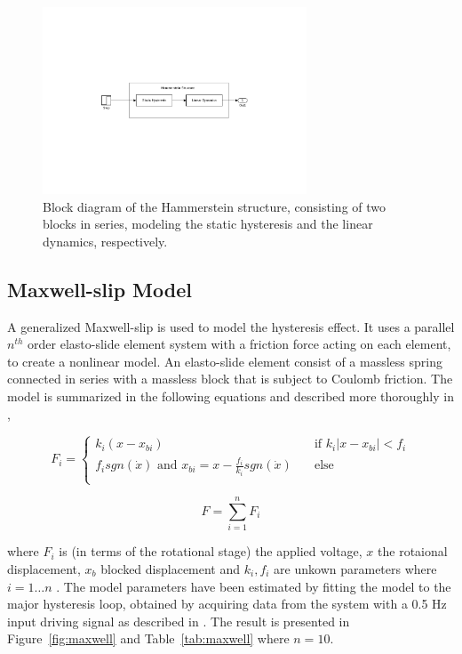 \begin{figure}[h]
  \centering %
  \includegraphics[width=0.7\textwidth, trim=8cm 8cm 7.73cm 8cm, clip=true]{fig/matlab/hammerstein}
  \caption{\label{fig:hammerstein}Block diagram of the Hammerstein structure, consisting of two blocks in series, modeling the static hysteresis and the linear dynamics, respectively.}
\end{figure}

\subsection{Maxwell-slip Model}
\label{sec:maxwell}
A generalized Maxwell-slip is used to model the hysteresis effect. It uses a parallel $n^{th}$ order elasto-slide element system with a friction force acting on each element, to create a nonlinear model. An elasto-slide element consist of a massless spring connected in series with a massless block that is subject to Coulomb friction. The model is summarized in the following equations and described more thoroughly in \citep{Ru:2016},

\begin{equation}
  \label{eq:maxwell_slip}
  F_i =
  \begin{cases}
    k_i(x - x_{bi}) & \quad \text{if }  k_i|x - x_{bi}| < f_i\\
    f_isgn(\dot{x}) \text{ and } x_{bi} = x - \frac{f_i}{k_i}sgn(\dot{x})  & \quad \text{else}\\
  \end{cases}
\end{equation}

\begin{equation}
  \label{eq:maxwell_sum}
  F = \displaystyle\sum_{i=1}^{n} F_i
\end{equation}

where $F_i$ is (in terms of the rotational stage) the applied voltage, $x$ the rotaional displacement, $x_b$ blocked displacement and $k_i, f_i$ are unkown parameters where $i=1 \hdots n$ . The model parameters have been estimated by fitting the model to the major hysteresis loop, obtained by acquiring data from the system with a 0.5 Hz input driving signal as described in \cite{ButcherIdentification:2015,ButcherController:2015}. The result is presented in Figure~\ref{fig:maxwell} and Table~\ref{tab:maxwell} where $n=10$.

